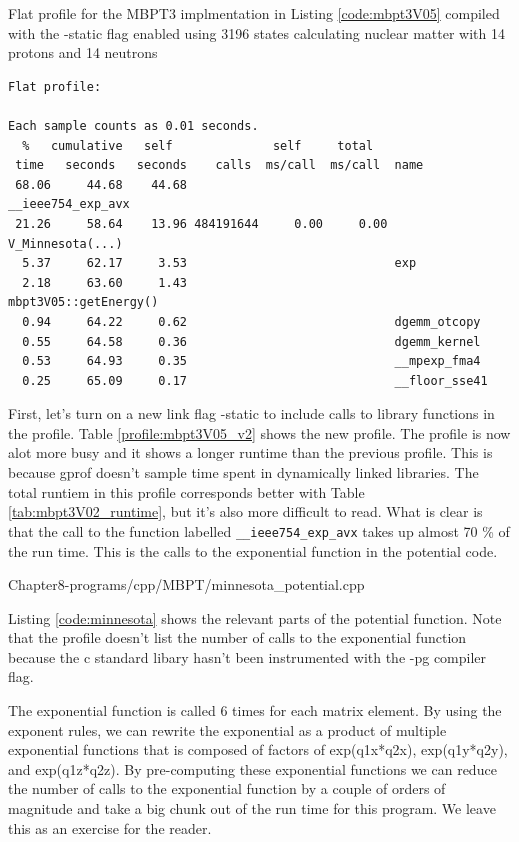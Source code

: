 \begin{table}[h]
\caption{Flat profile for the MBPT3 implmentation in Listing
\ref{code:mbpt3V05} compiled with the -static flag enabled using 3196 states
calculating nuclear matter with 14 protons and 14
neutrons}\label{profile:mbpt3V05_v2}
\begin{verbatim}
Flat profile:

Each sample counts as 0.01 seconds.
  %   cumulative   self              self     total           
 time   seconds   seconds    calls  ms/call  ms/call  name    
 68.06     44.68    44.68                             __ieee754_exp_avx
 21.26     58.64    13.96 484191644     0.00     0.00  V_Minnesota(...)
  5.37     62.17     3.53                             exp
  2.18     63.60     1.43                             mbpt3V05::getEnergy()
  0.94     64.22     0.62                             dgemm_otcopy
  0.55     64.58     0.36                             dgemm_kernel
  0.53     64.93     0.35                             __mpexp_fma4
  0.25     65.09     0.17                             __floor_sse41
\end{verbatim}
\end{table}
    First, let's turn on a new link flag -static to include calls to library
    functions in the profile. Table \ref{profile:mbpt3V05_v2} shows the new
    profile. The profile is now alot more busy and it shows a longer runtime
    than the previous profile. This is because gprof doesn't sample time spent
    in dynamically linked libraries. The total runtiem in this profile
    corresponds better with Table \ref{tab:mbpt3V02_runtime}, but it's also more
    difficult to read. What is clear is that the call to the function labelled
    \verb;__ieee754_exp_avx; takes up almost 70 \% of the run time. This is the
    calls to the exponential function in the potential code.


{Chapter8-programs/cpp/MBPT/minnesota_potential.cpp}

Listing \ref{code:minnesota} shows the relevant parts of the potential function.
Note that the profile doesn't list the number of calls to the exponential
function because the c standard libary hasn't been instrumented with the -pg
compiler flag.
    
The exponential function is called 6 times for each matrix element. By using
the exponent rules, we can rewrite the exponential as a product of multiple
exponential functions that is composed of factors of exp(q1x*q2x),
exp(q1y*q2y), and exp(q1z*q2z). By pre-computing these exponential functions
we can reduce the number of calls to the exponential function by a couple of
orders of magnitude and take a big chunk out of the run time for this
program. We leave this as an exercise for the reader.

